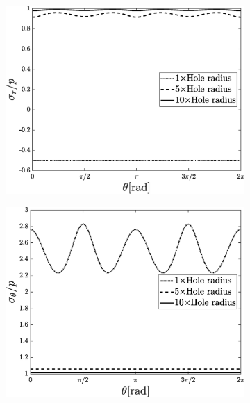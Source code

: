 \documentclass{article}
\begin{document}
\begin{figure}[H]
        \begin{subfigure}{0.5\textwidth}
            \includegraphics[width=1\linewidth, height=0.8\linewidth]{figures/sigma_r.eps} 
            \caption{}
            \label{fig:sigma_r}
        \end{subfigure}
        \begin{subfigure}{0.5\textwidth}
            \includegraphics[width=1\linewidth, height=0.8\linewidth]{figures/sigma_theta.eps} 
            \caption{}
            \label{fig:sigma_theta}
        \end{subfigure}

\end{figure}
\end{document}
